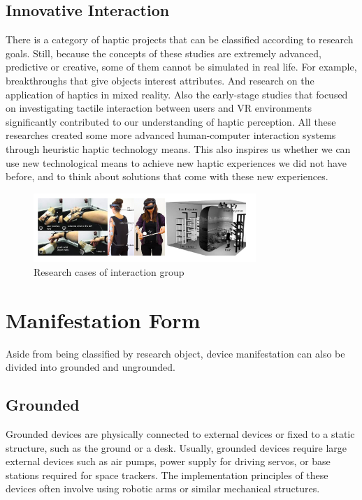 \subsection{Innovative Interaction}
There is a category of haptic projects that can be classified according to research goals. Still, because the concepts of these studies are extremely advanced, predictive or creative, some of them cannot be simulated in real life. For example, breakthroughs that give objects interest attributes\cite{ref_EMS002}. And research on the application of haptics in mixed reality\cite{ref_EMS004}. Also the early-stage studies that focused on investigating tactile interaction between users and VR environments significantly contributed to our understanding of haptic perception\cite{ref_001}. All these researches created some more advanced human-computer interaction systems through heuristic haptic technology means. This also inspires us whether we can use new technological means to achieve new haptic experiences we did not have before, and to think about solutions that come with these new experiences.

\begin{figure}[h]
\centering
\includegraphics[width=0.75\textwidth]{A_thesis/figures/010.png}
\caption{Research cases of interaction group}
\end{figure}

\newpage

\section{Manifestation Form}
Aside from being classified by research object, device manifestation can also be divided into grounded and ungrounded.

\subsection{Grounded}
Grounded devices are physically connected to external devices or fixed to a static structure, such as the ground or a desk. Usually, grounded devices require large external devices such as air pumps\cite{ref_007}\cite{ref_008}\cite{ref_015}, power supply for driving servos, or base stations required for space trackers\cite{ref_001}. The implementation principles of these devices often involve using robotic arms or similar mechanical structures\cite{ref_010}.

